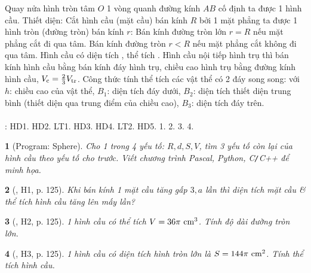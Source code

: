 \documentclass{article}
\newtheorem{baitoan}{}
\begin{document}
\begin{center}
\end{center}
 Quay nửa hình tròn tâm $O$ 1 vòng quanh đường kính $AB$ cố định ta được 1 hình cầu.  {\sf Thiết diện}: Cắt hình cầu (mặt cầu) bán kính $R$ bởi 1 mặt phẳng ta được 1 hình tròn (đường tròn) bán kính $r$: Bán kính đường tròn lớn $r = R$ nếu mặt phẳng cắt đi qua tâm. Bán kính đường tròn $r < R$ nếu mặt phẳng cắt không đi qua tâm.  Hình cầu có diện tích , thể tích .  Hình cầu nội tiếp hình trụ thì bán kính hình cầu bằng bán kính đáy hình trụ, chiều cao hình trụ bằng đường kính hình cầu, $V_{\rm c} = \frac{2}{3}V_{\rm tr}$.  {\sf Công thức tính thể tích các vật thể có 2 đáy song song}:  với $h$: chiều cao của vật thể, $B_1$: diện tích đáy dưới, $B_2$: diện tích thiết diện trung bình (thiết diện qua trung điểm của chiều cao), $B_3$: diện tích đáy trên.\\
\\
\cite[Chap. X, \S3, pp. 104--108]{SGK_Toan_9_Canh_Dieu_tap_1}: HD1. HD2. LT1. HD3. HD4. LT2. HD5. 1. 2. 3. 4.

\begin{baitoan}[{\sf Program}: Sphere]
	Cho 1 trong 4 yếu tố: $R,d,S,V$, tìm 3 yếu tố còn lại của hình cầu theo yếu tố cho trước. Viết chương trình {\sf Pascal, Python, C{\tt/}C++} để minh họa.
\end{baitoan}

\begin{baitoan}[\cite{Binh_boi_duong_Toan_9_tap_2}, H1, p. 125]
	Khi bán kính 1 mặt cầu tăng gấp $3,a$ lần thì diện tích mặt cầu \& thể tích hình cầu tăng lên mấy lần?
\end{baitoan}

\begin{baitoan}[\cite{Binh_boi_duong_Toan_9_tap_2}, H2, p. 125]
	1 hình cầu có thể tích $V = 36\pi\ {\rm cm}^3$. Tính độ dài đường tròn lớn.
\end{baitoan}

\begin{baitoan}[\cite{Binh_boi_duong_Toan_9_tap_2}, H3, p. 125]
	1 hình cầu có diện tích hình tròn lớn là $S = 144\pi\ {\rm cm}^2$. Tính thể tích hình cầu.
\end{baitoan}
\end{document}
